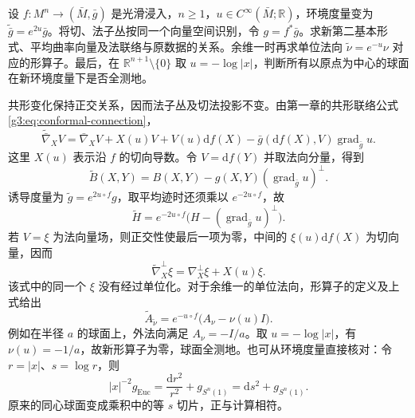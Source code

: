 \begin{exercise}\label{g3:ex:ambient-conformal-submanifold}
	设 \(f:M^n\to(\bar M,\bar g)\) 是光滑浸入，\(n\ge1\)，\(u\in C^\infty(\bar M;\mathbb R)\)，环境度量变为 \(\widetilde{\bar g}=e^{2u}\bar g\)。将切、法子丛按同一个向量空间识别，令 \(g=f^*\bar g\)。求新第二基本形式、平均曲率向量及法联络与原数据的关系。余维一时再求单位法向 \(\widetilde\nu=e^{-u}\nu\) 对应的形算子。最后，在 \(\mathbb R^{n+1}\setminus\{0\}\) 取 \(u=-\log|x|\)，判断所有以原点为中心的球面在新环境度量下是否全测地。
\end{exercise}
\begin{solution}
	共形变化保持正交关系，因而法子丛及切法投影不变。由第一章的共形联络公式\eqref{g3:eq:conformal-connection}，
	\[
		\widetilde{\bar\nabla}_XV
		=\bar\nabla_XV+X(u)V+V(u)\mathrm df(X)
		-\bar g(\mathrm df(X),V)\operatorname{grad}_{\bar g}u.
	\]
	这里 \(X(u)\) 表示沿 \(f\) 的切向导数。令 \(V=\mathrm df(Y)\) 并取法向分量，得到
	\[
		\widetilde B(X,Y)
		=B(X,Y)-g(X,Y)(\operatorname{grad}_{\bar g}u)^\perp.
	\]
	诱导度量为 \(\widetilde g=e^{2u\circ f}g\)，取平均迹时还须乘以 \(e^{-2u\circ f}\)，故
	\[
		\widetilde H=e^{-2u\circ f}
		\bigl(H-(\operatorname{grad}_{\bar g}u)^\perp\bigr).
	\]
	若 \(V=\xi\) 为法向量场，则正交性使最后一项为零，中间的 \(\xi(u)\mathrm df(X)\) 为切向量，因而
	\[
		\widetilde\nabla^\perp_X\xi
		=\nabla^\perp_X\xi+X(u)\xi.
	\]
	该式中的同一个 \(\xi\) 没有经过单位化。对于余维一的单位法向，形算子的定义及上式给出
	\[
		\widetilde A_{\widetilde\nu}
		=e^{-u\circ f}\bigl(A_\nu-\nu(u)I\bigr).
	\]
	例如在半径 \(a\) 的球面上，外法向满足 \(A_\nu=-I/a\)。取 \(u=-\log|x|\)，有 \(\nu(u)=-1/a\)，故新形算子为零，球面全测地。也可从环境度量直接核对：令 \(r=|x|\)、\(s=\log r\)，则
	\[
		|x|^{-2}g_{\mathrm{Euc}}
		=\frac{\mathrm dr^2}{r^2}+g_{S^n(1)}
		=\mathrm ds^2+g_{S^n(1)}.
	\]
	原来的同心球面变成乘积中的等 \(s\) 切片，正与计算相符。
\end{solution}
